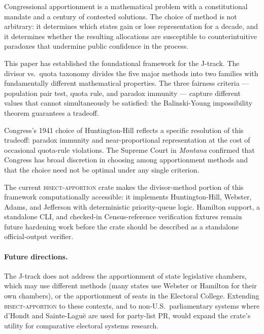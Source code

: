 Congressional apportionment is a mathematical problem with a constitutional
mandate and a century of contested solutions.
The choice of method is not arbitrary: it determines which states gain
or lose representation for a decade, and it determines whether the
resulting allocations are susceptible to counterintuitive paradoxes
that undermine public confidence in the process.

This paper has established the foundational framework for the J-track.
The divisor vs.\ quota taxonomy divides the five major methods into
two families with fundamentally different mathematical properties.
The three fairness criteria --- population pair test, quota rule,
and paradox immunity --- capture different values that cannot
simultaneously be satisfied: the Balinski-Young impossibility theorem
guarantees a tradeoff.

Congress's 1941 choice of Huntington-Hill reflects a specific resolution
of this tradeoff: paradox immunity and near-proportional representation
at the cost of occasional quota-rule violations.
The Supreme Court in \textit{Montana} confirmed that Congress has broad
discretion in choosing among apportionment methods and that the choice
need not be optimal under any single criterion.

The current \textsc{bisect-apportion} crate makes the divisor-method portion of
this framework computationally accessible: it implements Huntington-Hill,
Webster, Adams, and Jefferson with deterministic priority-queue logic.
Hamilton support, a standalone CLI, and checked-in Census-reference verification
fixtures remain future hardening work before the crate should be described as a
standalone official-output verifier.

\paragraph{Future directions.}
The J-track does not address the apportionment of state legislative
chambers, which may use different methods (many states use Webster
or Hamilton for their own chambers), or the apportionment of seats
in the Electoral College.
Extending \textsc{bisect-apportion} to these contexts, and to
non-U.S.\ parliamentary systems where d'Hondt and Sainte-Lagu\"e
are used for party-list PR, would expand the crate's utility
for comparative electoral systems research.
